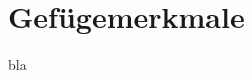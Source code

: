 \documentclass[a4paper, 12pt]{tubsreprt}
\begin{document}
\tableofcontents
\chapter{Gefügemerkmale}
bla
\end{document}
